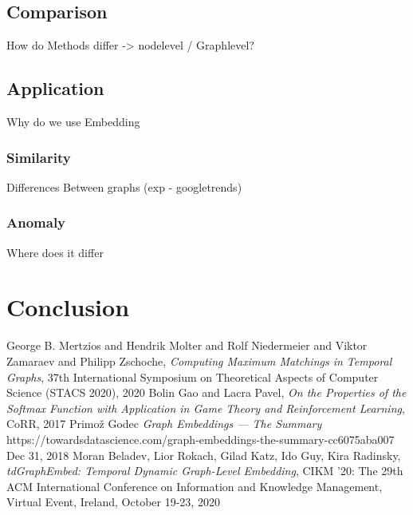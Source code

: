 \documentclass[sigconf]{acmart}
\begin{document}
\subsection{Comparison}
How do Methods differ -> nodelevel / Graphlevel?

\subsection{Application}
Why do we use Embedding
\subsubsection{Similarity}
Differences Between graphs (exp - googletrends)
\subsubsection{Anomaly}
Where does it differ

\section{Conclusion}


\begin{thebibliography}{1}
George B. Mertzios and Hendrik Molter and Rolf Niedermeier and Viktor Zamaraev and Philipp Zschoche,
\emph{Computing Maximum Matchings in Temporal Graphs},
37th International Symposium on Theoretical Aspects of Computer Science (STACS 2020), 2020
Bolin Gao and Lacra Pavel, \emph{On the Properties of the Softmax Function with Application in Game
Theory and Reinforcement Learning}, CoRR, 2017
Primož Godec \emph{Graph Embeddings — The Summary}\\
https://towardsdatascience.com/graph-embeddings-the-summary-cc6075aba007
Dec 31, 2018
Moran Beladev, Lior Rokach, Gilad Katz, Ido Guy, Kira Radinsky, \emph{tdGraphEmbed: Temporal Dynamic Graph-Level Embedding}, {CIKM} '20: The 29th {ACM} International Conference on Information and Knowledge Management, Virtual Event, Ireland, October 19-23, 2020

\end{thebibliography}
\end{document}
